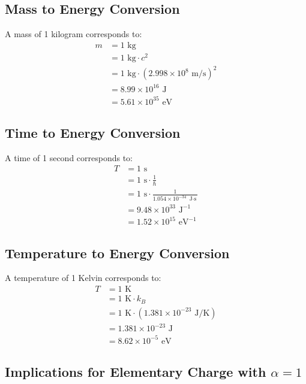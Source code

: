 \documentclass{article}
\begin{document}
	\subsection{Mass to Energy Conversion}
	
	A mass of 1 kilogram corresponds to:
	\begin{align}
		m &= 1 \text{ kg} \\
		&= 1 \text{ kg} \cdot c^2 \\
		&= 1 \text{ kg} \cdot (2.998 \times 10^8 \text{ m/s})^2 \\
		&= 8.99 \times 10^{16} \text{ J} \\
		&= 5.61 \times 10^{35} \text{ eV}
	\end{align}
	
	\subsection{Time to Energy Conversion}
	
	A time of 1 second corresponds to:
	\begin{align}
		T &= 1 \text{ s} \\
		&= 1 \text{ s} \cdot \frac{1}{\hbar} \\
		&= 1 \text{ s} \cdot \frac{1}{1.054 \times 10^{-34} \text{ J$\cdot$s}} \\
		&= 9.48 \times 10^{33} \text{ J}^{-1} \\
		&= 1.52 \times 10^{15} \text{ eV}^{-1}
	\end{align}
	
	\subsection{Temperature to Energy Conversion}
	
	A temperature of 1 Kelvin corresponds to:
	\begin{align}
		T &= 1 \text{ K} \\
		&= 1 \text{ K} \cdot k_B \\
		&= 1 \text{ K} \cdot (1.381 \times 10^{-23} \text{ J/K}) \\
		&= 1.381 \times 10^{-23} \text{ J} \\
		&= 8.62 \times 10^{-5} \text{ eV}
	\end{align}
	
	\subsection{Implications for Elementary Charge with $\alpha = 1$}
	
\end{document}
